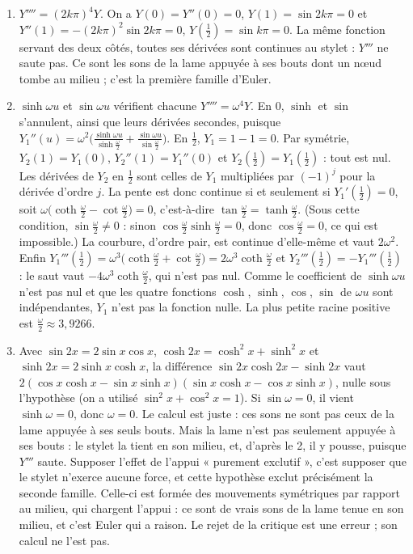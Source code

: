 \documentclass[11pt,a4paper]{article}
\begin{document}
\begin{solution}
\begin{enumerate}
\item $Y'''' = (2k\pi)^4Y$. On a $Y(0) = Y''(0) = 0$, $Y(1) = \sin 2k\pi = 0$ et
  $Y''(1) = -(2k\pi)^2\sin 2k\pi = 0$, $Y(\frac12) = \sin k\pi = 0$. La même fonction
  servant des deux côtés, toutes ses dérivées sont continues au stylet : $Y'''$ ne saute
  pas. Ce sont les sons de la lame appuyée à ses bouts dont un nœud tombe au milieu ;
  c'est la première famille d'Euler.
\item $\sinh\omega u$ et $\sin\omega u$ vérifient chacune $Y'''' = \omega^4Y$. En $0$,
  $\sinh$ et $\sin$ s'annulent, ainsi que leurs dérivées secondes, puisque
  $Y_1''(u) = \omega^2\bigl(\frac{\sinh\omega u}{\sinh\frac\omega2} +
  \frac{\sin\omega u}{\sin\frac\omega2}\bigr)$. En $\frac12$, $Y_1 = 1 - 1 = 0$. Par
  symétrie, $Y_2(1) = Y_1(0)$, $Y_2''(1) = Y_1''(0)$ et $Y_2(\frac12) = Y_1(\frac12)$ :
  tout est nul. Les dérivées de $Y_2$ en $\frac12$ sont celles de $Y_1$ multipliées
  par $(-1)^j$ pour la dérivée d'ordre $j$. La pente est donc continue si et seulement
  si $Y_1'(\frac12) = 0$, soit
  $\omega\bigl(\coth\frac\omega2 - \cot\frac\omega2\bigr) = 0$, c'est-à-dire
  $\tan\frac\omega2 = \tanh\frac\omega2$. (Sous cette condition, $\sin\frac\omega2 \neq 0$ :
  sinon $\cos\frac\omega2\sinh\frac\omega2 = 0$, donc $\cos\frac\omega2 = 0$, ce qui
  est impossible.) La courbure, d'ordre pair, est continue d'elle-même et vaut
  $2\omega^2$. Enfin $Y_1'''(\frac12) = \omega^3\bigl(\coth\frac\omega2 +
  \cot\frac\omega2\bigr) = 2\omega^3\coth\frac\omega2$ et $Y_2'''(\frac12) =
  -Y_1'''(\frac12)$ : le saut vaut $-4\omega^3\coth\frac\omega2$, qui n'est pas nul.
  Comme le coefficient de $\sinh\omega u$ n'est pas nul et que les quatre fonctions
  $\cosh$, $\sinh$, $\cos$, $\sin$ de $\omega u$ sont indépendantes, $Y_1$ n'est pas
  la fonction nulle. La plus petite racine positive est $\frac\omega2 \approx 3{,}9266$.
\item Avec $\sin 2x = 2\sin x\cos x$, $\cosh 2x = \cosh^2x + \sinh^2x$ et $\sinh 2x =
  2\sinh x\cosh x$, la différence $\sin 2x\cosh 2x - \sinh 2x$ vaut
  $2(\cos x\cosh x - \sin x\sinh x)(\sin x\cosh x - \cos x\sinh x)$, nulle sous
  l'hypothèse (on a utilisé $\sin^2x + \cos^2x = 1$). Si $\sin\omega = 0$, il vient
  $\sinh\omega = 0$, donc $\omega = 0$. Le calcul est juste : ces sons ne sont pas ceux
  de la lame appuyée à ses seuls bouts. Mais la lame n'est pas seulement appuyée à ses
  bouts : le stylet la tient en son milieu, et, d'après le 2, il y pousse, puisque
  $Y'''$ saute. Supposer l'effet de l'appui « purement exclutif », c'est supposer que le
  stylet n'exerce aucune force, et cette hypothèse exclut précisément la seconde
  famille. Celle-ci est formée des mouvements symétriques par rapport au milieu, qui
  chargent l'appui : ce sont de vrais sons de la lame tenue en son milieu, et c'est
  Euler qui a raison. Le rejet de la critique est une erreur ; son calcul ne l'est pas.
\end{enumerate}


\end{solution}
\end{document}
